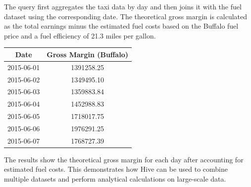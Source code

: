 \documentclass[12pt,ngerman]{scrartcl}
\begin{document}
The query first aggregates the taxi data by day and then joins it with the fuel dataset using the corresponding date. The theoretical gross margin is calculated as the total earnings minus the estimated fuel costs based on the Buffalo fuel price and a fuel efficiency of 21.3 miles per gallon.

\begin{center}
\begin{tabular}{|c|c|}
\hline
Date & Gross Margin (Buffalo) \\
\hline
2015-06-01 & 1391258.25 \\
2015-06-02 & 1349495.10 \\
2015-06-03 & 1359883.84 \\
2015-06-04 & 1452988.83 \\
2015-06-05 & 1718017.75 \\
2015-06-06 & 1976291.25 \\
2015-06-07 & 1768727.39 \\
\hline
\end{tabular}
\end{center}

The results show the theoretical gross margin for each day after accounting for estimated fuel costs. This demonstrates how Hive can be used to combine multiple datasets and perform analytical calculations on large-scale data.
\end{document}
